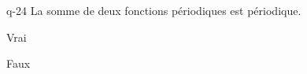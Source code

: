 \begin{truefalse}{q-24}
La somme de deux fonctions périodiques est périodique.
\item Vrai
\item* Faux
\end{truefalse}

